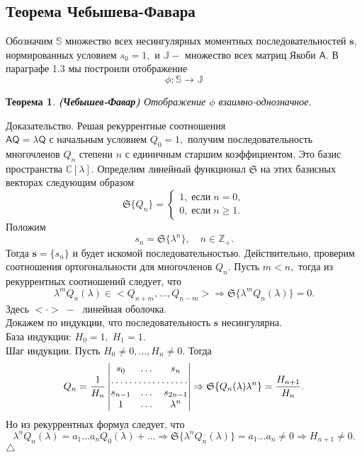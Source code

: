 \documentclass[12 pt, a4 paper]{article}
\theoremstyle{plain}   \newtheorem{Pro}{Задача}
\newtheorem{The}{Теорема}
\begin{document}
\subsection{ Теорема Чебышева-Фавара }
$ \; $
\\

Обозначим
$ \mathbb{S} $
множество всех несингулярных моментных последовательностей
$ \mathbf{s}, $
нормированных условием
$ s_0 =1 , $
и
$ \mathbb{J} - $
множество всех матриц Якоби
$ \mathsf{A} . $
В параграфе 1.3 мы построили отображение
$$
  \phi : \mathbb{S} \longrightarrow \mathbb{J}
$$
\begin{The}
{\bfseries (Чебышев-Фавар)}
Отображение
$ \phi $
взаимно-однозначное.
\end{The}
{\Large Доказательство.}
Решая рекуррентные соотношения\\
$ \mathsf{A} \mathsf{Q} = \lambda \mathsf{Q} $
с начальным условием
$ Q_0 =1 , $
получим последовательность многочленов
$ Q_n $
степени
$ n $
с единичным старшим коэффициентом.
Это базис пространства
$ \mathbb{C} [ \lambda ] . $
Определим линейный функционал
$ \mathfrak{S} $
на этих базисных векторах следующим образом
\begin{equation*}
  \mathfrak{S} \{ Q_n \} =
    \begin{cases}
	  1, \; если \; n=0, \\
	  0, \; если \; n \geq 1.
	\end{cases}
\end{equation*}
Положим
$$
  s_n = \mathfrak{S} \{ \lambda ^n \} ,
  \quad n \in \mathbb{Z}_+ .
$$
Тогда
$ \mathbf{s} = \{ s_n \} $
и будет искомой последовательностью.
Действительно, проверим соотношения ортогональности для
многочленов
$ Q_n . $
Пусть
$ m<n , $
тогда из рекуррентных соотношений следует, что
$$
  \lambda ^m Q_n (\lambda ) \in
  <Q_{n+m},...,Q_{n-m}> \Rightarrow
  \mathfrak{S} \{ \lambda ^m Q_n (\lambda ) \} =0.
$$
Здесь
$ < \cdot > \; - \; $
линейная оболочка.\\
Докажем по индукции, что последовательность
$ \mathbf{s} $
несингулярна.\\
База индукции:
$ H_0 =1, \; H_1 =1. $
\\
Шаг индукции. Пусть
$ H_0 \not = 0,..., H_n \not = 0. $
Тогда
\begin{equation*}
  Q_n =\frac{1}{H_n }
    \begin{vmatrix}
	  s_0 & \dots & s_n \\
	  \hdotsfor{3}\\
	  s_{n-1} & \dots & s_{2n-1}\\
	  1 & \dots & \lambda ^n
	\end{vmatrix}
  \Rightarrow
  \mathfrak{S} \{ Q_n (\lambda ) \lambda ^n \} =
  \frac{H_{n+1}}{H_n }.
\end{equation*}
Но из рекуррентных формул следует, что
$$
  \lambda ^n Q_n (\lambda ) =
  a_1 ...a_n Q_0 (\lambda ) +...
  \Rightarrow
  \mathfrak{S} \{ \lambda ^n Q_n (\lambda ) \} =
  a_1 ... a_n \not = 0
  \Rightarrow H_{n+1} \not =0.
$$    	      	  					    					
$ \triangle $
\newpage
\end{document}
